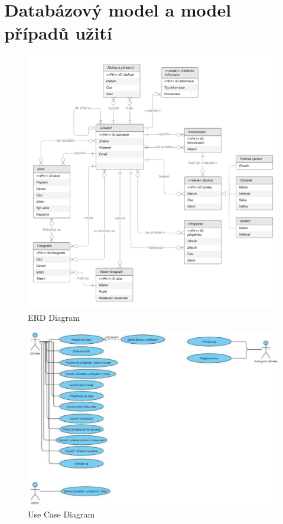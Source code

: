\documentclass[11pt,a4paper]{article}
\begin{document}
\section{Databázový model a model případů užití}
\begin{figure}[H]
  \includegraphics[width=\textwidth]{ERD}
  \caption{ERD Diagram}
\end{figure}

\begin{figure}[H]
  \includegraphics[width=\textwidth]{UCD}
  \caption{Use Case Diagram}
\end{figure}
\end{document}
